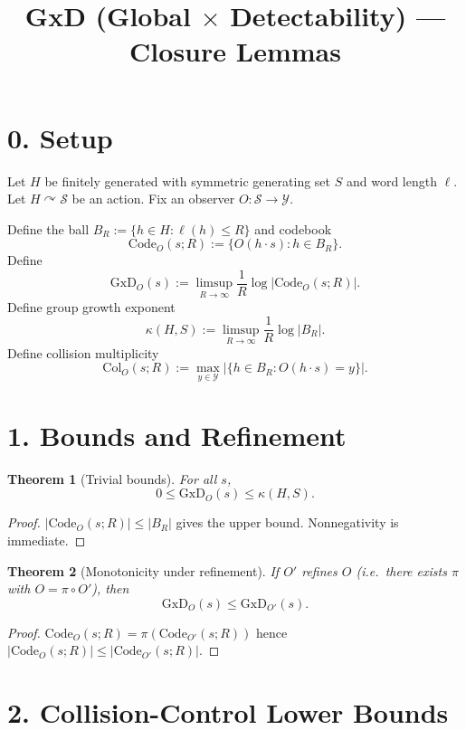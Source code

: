 \documentclass[11pt]{article}
\title{GxD (Global $\times$ Detectability) --- Closure Lemmas}
\author{}
\date{}
\newtheorem{theorem}{Theorem}
\begin{document}
\maketitle

\section*{0. Setup}

Let $H$ be finitely generated with symmetric generating set $S$ and word length $\ell$.
Let $H\curvearrowright \mathcal S$ be an action.
Fix an observer $O:\mathcal S\to \mathcal Y$.

Define the ball $B_R:=\{h\in H:\ell(h)\le R\}$ and codebook
\[
\mathrm{Code}_O(s;R):=\{O(h\cdot s):h\in B_R\}.
\]
Define
\[
\mathrm{GxD}_O(s):=\limsup_{R\to\infty}\frac1R\log|\mathrm{Code}_O(s;R)|.
\]
Define group growth exponent
\[
\kappa(H,S):=\limsup_{R\to\infty}\frac1R\log|B_R|.
\]
Define collision multiplicity
\[
\mathrm{Col}_O(s;R):=\max_{y\in\mathcal Y}\bigl|\{h\in B_R:O(h\cdot s)=y\}\bigr|.
\]

\section*{1. Bounds and Refinement}

\begin{theorem}[Trivial bounds]
For all $s$,
\[
0\le \mathrm{GxD}_O(s)\le \kappa(H,S).
\]
\end{theorem}

\begin{proof}
$|\mathrm{Code}_O(s;R)|\le |B_R|$ gives the upper bound. Nonnegativity is immediate.
\end{proof}

\begin{theorem}[Monotonicity under refinement]
If $O'$ refines $O$ (i.e.\ there exists $\pi$ with $O=\pi\circ O'$), then
\[
\mathrm{GxD}_{O}(s)\le \mathrm{GxD}_{O'}(s).
\]
\end{theorem}

\begin{proof}
$\mathrm{Code}_{O}(s;R)=\pi(\mathrm{Code}_{O'}(s;R))$ hence
$|\mathrm{Code}_{O}(s;R)|\le|\mathrm{Code}_{O'}(s;R)|$.
\end{proof}

\section*{2. Collision-Control Lower Bounds}
\end{document}
